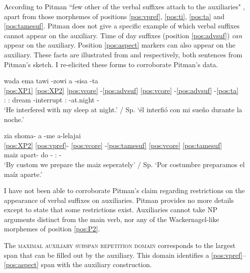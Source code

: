 \documentclass[output=paper,hidelinks]{langscibook}
\begin{document}

According to Pitman ``few other of the verbal suffixes attach to the auxiliaries" \citep[71]{pitman:1980:araonasketch}, apart from those morphemes of positions \ref{pos:vpref}, \ref{pos:ti}, \ref{pos:ta} and \ref{pos:tamesuf}. Pitman does not give a specific example of which verbal suffixes cannot appear on the auxiliary. Time of day suffixes (position \ref{pos:advsuf}) \textit{can} appear on the auxiliary. Position \ref{pos:aspect} markers can also appear on the auxiliary. These facts are illustrated from  and  respectively, both sentences from Pitman's sketch. I re-elicited these forms to corroborate Pitman's data.

\ea \label{ex:tawizowi}
    \glll wada ema tawi -zowi a -sisa -ta  \\
    \ref{pos:XP1} \ref{pos:XP2} \ref{pos:vcore} -\ref{pos:advsuf} \ref{pos:vcore} -\ref{pos:advsuf} -\ref{pos:ta} \\
    \Tsg{}:\Erg{} \Fsg{}:\Abs{} dream -interrupt \Aux{}:\Tr{} -at.night -\Third\Aarg{} \\
    \glt `He interfered with my sleep at night.' / Sp. `él interfió con mi sueño durante la noche.'  \hfill \citep[41]{pitman:1980:araonasketch}
\z 

\ea \label{ex:alelajai}
    \glll zia shoma- a -me a-lelajai \\
    \ref{pos:XP2} \ref{pos:vpref}- \ref{pos:vcore} -\ref{pos:tamesuf} \ref{pos:vcore} \ref{pos:tamesuf}   \\
    maiz apart- do -\Caus{} \Aux:\Tr{} -\Hab{} \\
    \glt `By custom we prepare the maiz seperately' / Sp. `Por costumbre preparamos el maíz aparte.'  \hfill \citep[31]{pitman:1980:araonasketch}
\z 

I have not been able to corroborate Pitman's claim regarding restrictions on the appearance of verbal suffixes on auxiliaries. Pitman provides no more details except to state that some restrictions exist. Auxiliaries cannot take NP arguments distinct from the main verb, nor any of the Wackernagel-like morphemes of position \ref{pos:P2}.

The \textsc{maximal auxiliary subspan repetition domain} corresponds to the lar\-gest span that can be filled out by the auxiliary. This domain identifies a \ref{pos:vpref}--\ref{pos:aspect} span with the auxiliary construction.
\end{document}
